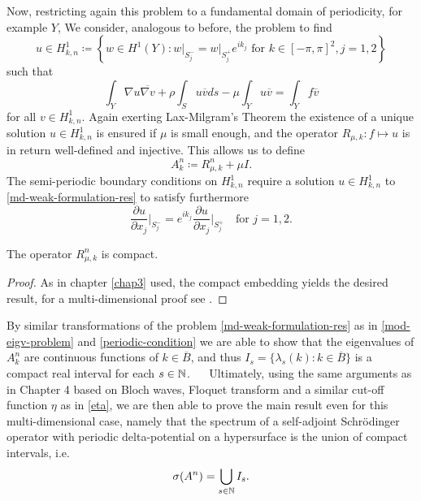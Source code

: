 Now, restricting again this problem to a fundamental domain of periodicity, for example $Y$,
We consider, analogous to before, the problem to find 
	\[ u \in H^{1}_{k, n} \coloneqq \left\{ w \in H^{1}(Y) \colon w \big|_{S_{j}^{-}} = w \big|_{S_{j}^{+}} e^{i k_{j}} \text{ for } k \in [-\pi, \pi]^{2}, j = 1,2 \right\} \]
such that
	\begin{equation}
		\int_{Y} \nabla u \overline{\nabla v} + \rho \int_{S} u \overline{v} ds - \mu \int_{Y} u \overline{v} = \int_{Y} f \overline{v} \label{md-weak-formulation-res}
	\end{equation} 
for all $v \in H^{1}_{k, n}$. 
Again exerting Lax-Milgram's Theorem the existence of a unique solution $u \in H^{1}_{k, n}$ is ensured if $\mu$ is small enough, and the operator $R_{\mu, k} \colon f \mapsto u$ is in return well-defined and injective. This allows us to define 
	\[ A_{k}^{n} \coloneqq R_{\mu, k}^{n} + \mu I. \]
The semi-periodic boundary conditions on $H^{1}_{k,n}$ require a solution $u \in H^{1}_{k, n}$ to \eqref{md-weak-formulation-res} to satisfy furthermore
	\[ \frac{\partial u}{\partial x_{j}}\big|_{S_{j}^{-}} = e^{ik_{j}} \frac{\partial u}{\partial x_{j}}\big|_{S_{j}^{+}} \quad \text{for } j = 1, 2.  \] %
	
\begin{theorem}
	The operator $R_{\mu, k}^{n}$ is compact.	

	\begin{proof}
		As in chapter \ref{chap3} used, the compact embedding yields the desired result, for a multi-dimensional proof see \cite[Chap. 4]{Adams}.	
	\end{proof}
\end{theorem}

By similar transformations of the problem \eqref{md-weak-formulation-res} as in \eqref{mod-eigv-problem} and \eqref{periodic-condition} we are able to show that the eigenvalues of $A^{n}_{k}$ are continuous functions of $k \in \overline{B}$, and thus $I_{s} = \{ \lambda_{s}(k) : k \in \overline{B} \}$ is a compact real interval for each $s \in \mathbb{N}$. %
~\newline ~\newline
Ultimately, using the same arguments as in Chapter 4 based on Bloch waves, Floquet transform and a similar cut-off function $\eta$ as in \eqref{eta}, we are then able to prove the main result even for this multi-dimensional case, namely that the spectrum of a self-adjoint Schrödinger operator with periodic delta-potential on a hypersurface is the union of compact intervals, i.e.
	\[ \sigma(A^{n}) = \bigcup_{s \in \mathbb{N}} I_{s}. \]
